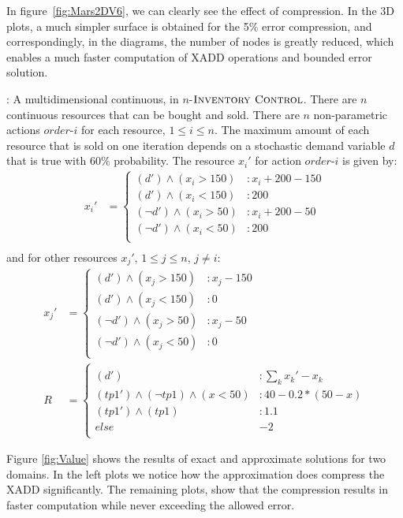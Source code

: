 In figure~\ref{fig:Mars2DV6}, we can clearly see the effect of compression. In the 3D plots, a much simpler surface is obtained for the 5\% error compression, and correspondingly, in the diagrams, the number of nodes is greatly reduced, which enables a much faster computation of XADD operations and bounded error solution. 

\Invent:
A multidimensional continuous, in $n$-$\textsc{Inventory Control}$. There are $n$ continuous resources that can be bought and sold. There are $n$ non-parametric actions $order$-$i$ for each resource, $ 1 \leq i \leq n$. The maximum amount of  each resource that is sold on one iteration depends on a stochastic demand variable $d$ that is true with $60\%$ probability. The resource $x_i'$ for action $order$-$i$ is given by:
{\footnotesize
\begin{align*}
x_i' & = \begin{cases} 
(d') \wedge (x_i > 150) &: x_i + 200 - 150\\
(d') \wedge (x_i < 150) &:  200\\
(\neg d') \wedge (x_i > 50) &: x_i + 200 - 50\\
(\neg d') \wedge (x_i < 50) &:  200\\
\end{cases} \\
\end{align*} }
and for other resources $x_j'$, $1 \leq j \leq n$, $j\neq i$:\\
{\footnotesize
\begin{align*}
x_j' & = \begin{cases} 
(d') \wedge (x_j > 150) &: x_j - 150\\
(d') \wedge (x_j < 150) &:  0\\
(\neg d') \wedge (x_j > 50) &: x_j - 50\\
(\neg d') \wedge (x_j < 50) &:  0\\
\end{cases} \\
R & = \begin{cases} \\
(d') &: \sum_{k} {x_k' - x_k}\\
(tp1') \wedge (\neg tp1) \wedge (x < 50) &: 40 - 0.2*(50-x)\\
(tp1') \wedge ( tp1) &:  1.1\\
else & -2\\
\end{cases} 
\end{align*} }


Figure \ref{fig:Value} shows the results of exact and approximate solutions for two domains. In the left plots we notice how the approximation does compress the XADD significantly. The remaining plots, show that the compression results in faster computation while never exceeding the allowed error.

